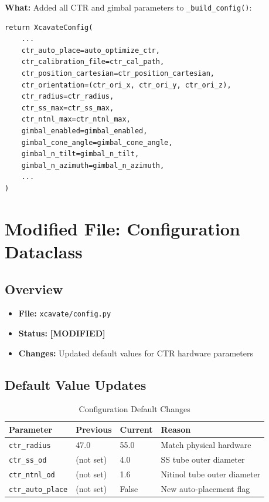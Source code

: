 \documentclass[11pt,a4paper]{article}
\newcommand{\filename}[1]{\texttt{\textcolor{accentblue}{#1}}}
\newcommand{\funcname}[1]{\texttt{\textcolor{codepurple}{#1}}}
\newcommand{\modlabel}{\textcolor{modifiedfile}{\textbf{[MODIFIED]}}}
\begin{document}
\textbf{What:} Added all CTR and gimbal parameters to \funcname{\_build\_config()}:

\begin{lstlisting}
return XcavateConfig(
    ...
    ctr_auto_place=auto_optimize_ctr,
    ctr_calibration_file=ctr_cal_path,
    ctr_position_cartesian=ctr_position_cartesian,
    ctr_orientation=(ctr_ori_x, ctr_ori_y, ctr_ori_z),
    ctr_radius=ctr_radius,
    ctr_ss_max=ctr_ss_max,
    ctr_ntnl_max=ctr_ntnl_max,
    gimbal_enabled=gimbal_enabled,
    gimbal_cone_angle=gimbal_cone_angle,
    gimbal_n_tilt=gimbal_n_tilt,
    gimbal_n_azimuth=gimbal_n_azimuth,
    ...
)
\end{lstlisting}

\section{Modified File: Configuration Dataclass}
\label{sec:config}

\subsection{Overview}

\begin{itemize}[nosep]
    \item \textbf{File:} \filename{xcavate/config.py}
    \item \textbf{Status:} \modlabel
    \item \textbf{Changes:} Updated default values for CTR hardware parameters
\end{itemize}

\subsection{Default Value Updates}

\begin{table}[H]
\centering
\caption{Configuration Default Changes}
\begin{tabular}{llll}
\toprule
\textbf{Parameter} & \textbf{Previous} & \textbf{Current} & \textbf{Reason} \\
\midrule
\texttt{ctr\_radius} & 47.0 & 55.0 & Match physical hardware \\
\texttt{ctr\_ss\_od} & (not set) & 4.0 & SS tube outer diameter \\
\texttt{ctr\_ntnl\_od} & (not set) & 1.6 & Nitinol tube outer diameter \\
\texttt{ctr\_auto\_place} & (not set) & False & New auto-placement flag \\
\bottomrule
\end{tabular}
\end{table}
\end{document}
